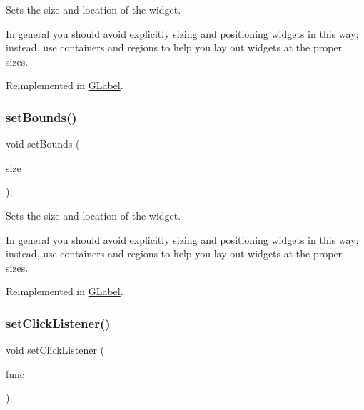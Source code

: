 Sets the size and location of the widget. 

In general you should avoid explicitly sizing and positioning widgets in this way; instead, use containers and regions to help you lay out widgets at the proper sizes. 

Reimplemented in \mbox{\hyperlink{classGLabel_ab9f89f193ad29d66c547cfee29ffde39}{G\+Label}}.

\mbox{\label{classGInteractor_acada386653f008cacc7cce86426bef7c}} 
\subsubsection{\texorpdfstring{set\+Bounds()}{setBounds()}\hspace{0.1cm}{\footnotesize\ttfamily [2/2]}}
{\footnotesize\ttfamily void set\+Bounds (\begin{DoxyParamCaption}\item[{const \mbox{\hyperlink{structGRectangle}{G\+Rectangle}} \&}]{size }\end{DoxyParamCaption})\hspace{0.3cm}{\ttfamily [virtual]}, {\ttfamily [inherited]}}



Sets the size and location of the widget. 

In general you should avoid explicitly sizing and positioning widgets in this way; instead, use containers and regions to help you lay out widgets at the proper sizes. 

Reimplemented in \mbox{\hyperlink{classGLabel_adb836652705fdc4b7e90b7a3afc56a37}{G\+Label}}.

\mbox{\label{classGInteractor_abd40af6921242584d0954f173911b190}} 
\subsubsection{\texorpdfstring{set\+Click\+Listener()}{setClickListener()}\hspace{0.1cm}{\footnotesize\ttfamily [1/2]}}
{\footnotesize\ttfamily void set\+Click\+Listener (\begin{DoxyParamCaption}\item[{G\+Event\+Listener}]{func }\end{DoxyParamCaption})\hspace{0.3cm}{\ttfamily [virtual]}, {\ttfamily [inherited]}}



